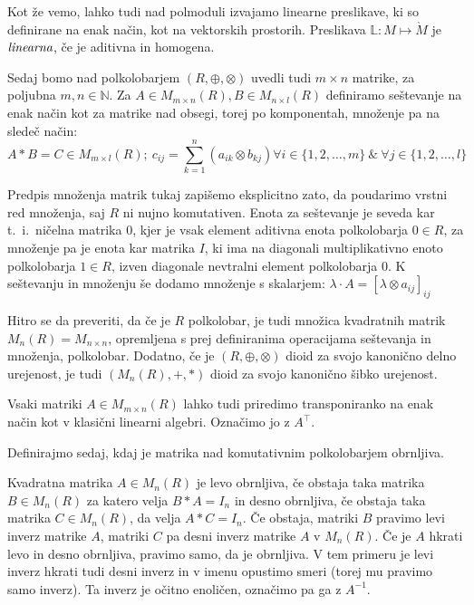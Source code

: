 \documentclass[mat1]{fmfdelo}
\newcommand{\N}{\mathbb{N}}
\newcommand{\pojem}[1]{\ensuremath{\emph{#1}}}
\begin{document}
Kot že vemo, lahko tudi nad polmoduli izvajamo linearne preslikave, ki so definirane na enak način, kot na vektorskih prostorih. Preslikava $\mathbb{L}: M \mapsto \grave{M}$ je \pojem{linearna}, če je aditivna in homogena.

Sedaj bomo nad polkolobarjem $(R, \oplus, \otimes)$ uvedli tudi $m\times n$ matrike, za poljubna $m,n\in\N$. Za $A\in M_{m\times n}(R), B\in M_{n\times l}(R)$ definiramo seštevanje na enak način kot za matrike nad obsegi, torej po komponentah, množenje pa na sledeč način:
$$ 
	A*B = C \in M_{m\times l}(R);~ c_{ij} = \sum_{k = 1}^{n}(a_{ik}\otimes b_{kj}) \forall i \in \{1, 2, \ldots, m\}~\&~\forall j \in \{1, 2, \ldots, l\}
$$

Predpis množenja matrik tukaj zapišemo eksplicitno zato, da poudarimo vrstni red množenja, saj $R$ ni nujno komutativen. Enota za seštevanje je seveda kar t.~i.~ničelna matrika $0$, kjer je vsak element aditivna enota polkolobarja $0\in R$, za množenje pa je enota kar matrika $I$, ki ima na diagonali multiplikativno enoto polkolobarja $1\in R$, izven diagonale nevtralni element polkolobarja $0$. K seštevanju in množenju še dodamo množenje s skalarjem: $\lambda \cdot A = [\lambda \otimes a_{ij}]_{ij}$

Hitro se da preveriti, da če je $R$ polkolobar, je tudi množica kvadratnih matrik $M_n(R) = M_{n\times n}$, opremljena s prej definiranima operacijama seštevanja in množenja, polkolobar. Dodatno, če je $(R, \oplus, \otimes)$ dioid za svojo kanonično delno urejenost, je tudi $(M_n(R), +, *)$ dioid za svojo kanonično šibko urejenost.

Vsaki matriki $A\in M_{m\times n}(R)$ lahko tudi priredimo transponiranko na enak način kot v klasični linearni algebri. Označimo jo z $A^{\top}$.

Definirajmo sedaj, kdaj je matrika nad komutativnim polkolobarjem obrnljiva.

\begin{definicija}\label{def:invmatr}
	Kvadratna matrika $A\in M_n(R)$ je levo obrnljiva, če obstaja taka matrika $B\in M_n(R)$ za katero velja $B*A = I_n$ in desno obrnljiva, če obstaja taka matrika $C\in M_n(R)$, da velja $A*C = I_n$. Če obstaja, matriki $B$ pravimo levi inverz matrike $A$, matriki $C$ pa desni inverz matrike $A$ v $M_n(R)$. Če je $A$ hkrati levo in desno obrnljiva, pravimo samo, da je obrnljiva. V tem primeru je levi inverz hkrati tudi desni inverz in v imenu opustimo smeri (torej mu pravimo samo inverz). Ta inverz je očitno enoličen, označimo pa ga z $A^{-1}$.
\end{definicija}
\end{document}
